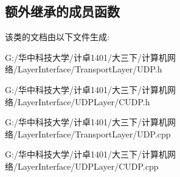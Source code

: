 \subsection*{额外继承的成员函数}


该类的文档由以下文件生成\+:\begin{DoxyCompactItemize}
\item 
G\+:/华中科技大学/计卓1401/大三下/计算机网络/\+Layer\+Interface/\+Transport\+Layer/U\+D\+P.\+h\item 
G\+:/华中科技大学/计卓1401/大三下/计算机网络/\+Layer\+Interface/\+U\+D\+P\+Layer/C\+U\+D\+P.\+h\item 
G\+:/华中科技大学/计卓1401/大三下/计算机网络/\+Layer\+Interface/\+Transport\+Layer/U\+D\+P.\+cpp\item 
G\+:/华中科技大学/计卓1401/大三下/计算机网络/\+Layer\+Interface/\+U\+D\+P\+Layer/C\+U\+D\+P.\+cpp\end{DoxyCompactItemize}
